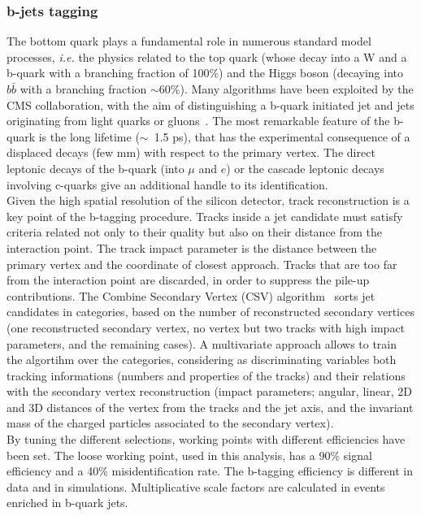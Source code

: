 \subsubsection{b-jets tagging}
\indent The bottom quark plays a fundamental role in numerous standard model processes, \textit{i.e.} the physics related to the top quark (whose decay into a W and a b-quark with a branching fraction of 100\%) and the Higgs boson (decaying into $b \bar{b}$ with a branching fraction $\sim$60\%). Many algorithms have been exploited by the CMS collaboration, with the aim of distinguishing a b-quark initiated jet and jets originating from light quarks or gluons~\cite{CMS-PAS-BTV-15-001}. The most remarkable feature of the b-quark is the long lifetime ($\sim$~1.5 ps), that has the experimental consequence of a displaced decays (few mm) with respect to the primary vertex. The direct leptonic decays of the b-quark (into $\mu$ and $e$) or the cascade leptonic decays involving c-quarks give an additional handle to its identification.\\
Given the high spatial resolution of the silicon detector, track reconstruction is a key point of the b-tagging procedure. Tracks inside a jet candidate must satisfy criteria related not only to their quality but also on their distance from the interaction point. The track impact parameter is the distance between the primary vertex and the coordinate of closest approach. Tracks that are too far from the interaction point are discarded, in order to suppress the pile-up contributions. The Combine Secondary Vertex (CSV) algorithm~\cite{Chatrchyan:2012jua} sorts jet candidates in categories, based on the number of reconstructed secondary vertices (one reconstructed secondary vertex, no vertex but two tracks with high impact parameters, and the remaining cases). A multivariate approach allows to train the algortihm over the categories, considering as discriminating variables both tracking informations (numbers and properties of the tracks) and their relations with the secondary vertex reconstruction (impact parameters; angular, linear, 2D and 3D distances of the vertex from the tracks and the jet axis, and the invariant mass of the charged particles associated to the secondary vertex).\\
By tuning the different selections, working points with different efficiencies have been set. The loose working point, used in this analysis, has a 90\% signal efficiency and a 40\% misidentification rate. The b-tagging efficiency is different in data and in simulations. Multiplicative scale factors are calculated in events enriched in b-quark jets.\\

